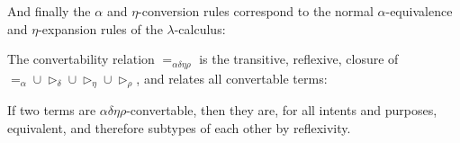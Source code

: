\documentclass{article}
\newcommand{\fun}[2]{\lambda #1. #2}
\newcommand{\for}[2]{\Pi_{#1}#2}
\begin{document}

And finally the $\alpha$ and $\eta$-conversion rules correspond to the normal $\alpha$-equivalence and $\eta$-expansion rules of the $\lambda$-calculus:


The convertability relation $=_{\alpha \delta \eta \rho}$ is the transitive, reflexive, closure of $=_\alpha \cup \triangleright_\delta \cup \triangleright_\eta \cup \triangleright_\rho$, and relates all convertable terms:


If two terms are $\alpha \delta \eta \rho$-convertable, then they are, for all intents and purposes, equivalent, and therefore subtypes of each other by reflexivity.
\end{document}
